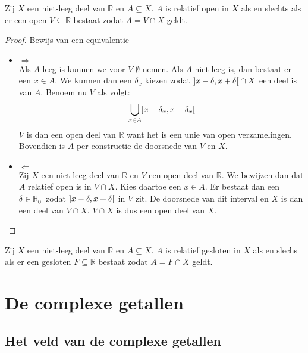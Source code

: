 \documentclass[main.tex]{subfiles}
\begin{document}
\begin{pr}
  Zij $X$ een niet-leeg deel van $\mathbb{R}$ en $A \subseteq X$.
  $A$ is relatief open in $X$ als en slechts als er een open $V\subseteq \mathbb{R}$ bestaat zodat $A=V \cap X$ geldt.

  \begin{proof}
    Bewijs van een equivalentie\\
    \begin{itemize}
    \item $\Rightarrow$\\
      Als $A$ leeg is kunnen we voor $V$ $\emptyset$ nemen.
      Als $A$ niet leeg is, dan bestaat er een $x\in A$.
      We kunnen dan een $\delta_{x}$ kiezen zodat $\interval[open]{x-\delta}{x+\delta} \cap X$ een deel is van $A$.
      Benoem nu $V$ als volgt:
      \[ \bigcup_{x\in A}\interval[open]{x-\delta_{x}}{x+\delta_{x}} \]
      $V$ is dan een open deel van $\mathbb{R}$ want het is een unie van open verzamelingen.
      Bovendien is $A$ per constructie de doorsnede van $V$ en $X$.
    \item $\Leftarrow$\\
      Zij $X$ een niet-leeg deel van $\mathbb{R}$ en $V$ een open deel van $\mathbb{R}$.
      We bewijzen dan dat $A$ relatief open is in $V\cap X$.
      Kies daartoe een $x\in A$. Er bestaat dan een $\delta\in \mathbb{R}_{0}^{+}$ zodat $\interval[open]{x-\delta}{x+\delta}$ in $V$ zit.
      De doorsnede van dit interval en $X$ is dan een deel van $V \cap X$.
      $V\cap X$ is dus een open deel van $X$.
    \end{itemize}
  \end{proof}
\end{pr}

\begin{pr}
  Zij $X$ een niet-leeg deel van $\mathbb{R}$ en $A \subseteq X$.
  $A$ is relatief gesloten in $X$ als en slechs als er een gesloten $F \subseteq \mathbb{R}$ bestaat zodat $A=F \cap X$ geldt.
\end{pr}

\section{De complexe getallen}
\label{sec:de-complexe-getallen}

\subsection{Het veld van de complexe getallen}
\label{sec:het-veld-van}
\end{document}
